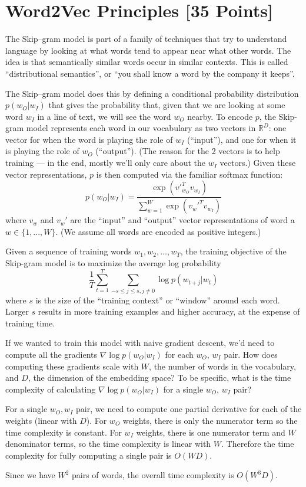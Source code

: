 \newpage
\section{Word2Vec Principles [35 Points]}

The Skip--gram model is part of a family of techniques that try to understand language by looking at what words tend to appear near what other words.  The idea is that semantically similar words occur in similar contexts.  This is called ``distributional semantics'', or ``you shall know a word by the company it keeps''.  

The Skip--gram model does this by defining a conditional probability distribution $p(w_O|w_I)$ that gives the probability that, given that we are looking at some word $w_I$ in a line of text, we will see the word $w_O$ nearby.  To encode $p$, the Skip-gram model represents each word in our vocabulary as two vectors in $\mathbb{R}^D$: one vector for when the word is playing the role of $w_I$ (``input''), and one for when it is playing the role of $w_O$ (``output'').  (The reason for the 2 vectors is to help training --- in the end, mostly we'll only care about the $w_I$ vectors.)  Given these vector representations, $p$ is then computed via the familiar softmax function:
\[ p(w_O|w_I) = \frac{\exp \left({v'}_{w_O}^T v_{w_I} \right)}{\sum_{w=1}^W \exp \left( {v_w'}^T v_{w_I} \right)} \tag{2} \label{eqn:softmax} \]
where $v_w$ and $v_w'$ are the ``input'' and ``output'' vector representations of word a $w \in \{1, ..., W\}$.  (We assume all words are encoded as positive integers.)

Given a sequence of training words $w_1, w_2, \hdots, w_T$, the training objective of the Skip-gram model is to maximize the average log probability
\[ \frac{1}{T}  \sum_{t=1}^T \sum_{-s \leq j \leq s, j \neq 0} \log p(w_{t+j}|w_t) \tag{1}\label{eqn:opt} \] where $s$ is the size of the ``training context'' or ``window'' around each word. Larger $s$ results in more training examples and higher accuracy, at the expense of training time.

\problem[5]
If we wanted to train this model with naive gradient descent, we'd need to compute all the gradients $\nabla \log p(w_O|w_I)$ for each $w_O$, $w_I$ pair.  How does computing these gradients scale with $W$, the number of words in the vocabulary, and $D$, the dimension of the embedding space? To be specific, what is the time complexity of calculating $\nabla \log p(w_O|w_I)$ for a single $w_O$, $w_I$ pair?

\begin{solution}
	For a single $w_O, w_I$ pair, we need to compute one partial derivative for each of the weights (linear with $D$).
	For $w_O$ weights, there is only the numerator term so the time complexity is constant.
	For $w_I$ weights, there is one numerator term and $W$ denominator terms, so the time complexity is linear with $W$.
	Therefore the time complexity for fully computing a single pair is $O(WD)$.

	Since we have $W^2$ pairs of words, the overall time complexity is $O(W^3 D)$.
\end{solution}



